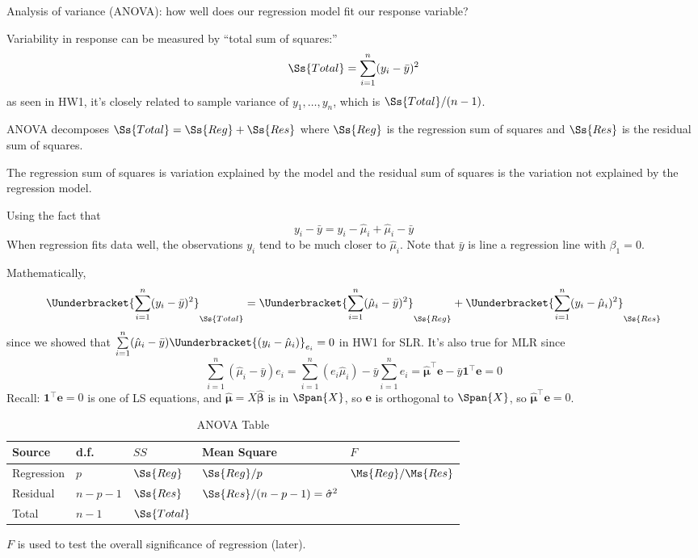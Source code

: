Analysis of variance (ANOVA): how well
does our regression model fit our
response variable?

Variability in response can be measured by
``total sum of squares:''
\[ \Ss{Total} =
    \sum\limits_{i=1}^{n} (y_i-\bar{y})^2 \]
as seen in HW1, it's closely related to
sample variance of $ y_1,\ldots,y_n $,
which is $ \Ss{Total}/(n-1) $.

ANOVA decomposes $ \Ss{Total}=\Ss{Reg}+\Ss{Res} $
where $ \Ss{Reg} $ is the regression sum of squares
and $ \Ss{Res} $ is the residual sum of squares.

The regression sum of squares is variation explained by
the model
and the residual sum of squares is the variation not
explained by the regression model.

Using the fact that
\[ y_i-\bar{y}=y_i-\hat{\mu}_i+\hat{\mu}_i-\bar{y} \]
When regression fits data well,
the observations $ y_i $ tend to be much closer to $ \hat{\mu}_i $.
Note that $ \bar{y} $ is line a regression line with $ \beta_1=0 $.

Mathematically,
\[ \Uunderbracket{\sum\limits_{i=1}^{n} (y_i-\bar{y})^2}_{\Ss{Total}}
    =\Uunderbracket{\sum\limits_{i=1}^{n} (\hat{\mu}_i-\bar{y})^2}_{\Ss{Reg}}+
    \Uunderbracket{\sum\limits_{i=1}^{n} (y_i-\hat{\mu}_i)^2}_{\Ss{Res}} \]
since we showed that $ \sum\limits_{i=1}^{n}(\hat{\mu}_i-\bar{y})
    \Uunderbracket{(y_i-\hat{\mu}_i)}_{e_i}=0 $ in HW1 for SLR\@.
It's also true for MLR since
\[ \sum\limits_{i=1}^{n} (\hat{\mu}_i-\bar{y})e_i=
    \sum\limits_{i=1}^{n} (e_i\hat{\mu}_i)-\bar{y}\sum\limits_{i=1}^{n} e_i
    =\hat{\symbf{\mu}}^\top\symbf{e}-\bar{y}\symbf{1}^\top\symbf{e}=0 \]
Recall: $ \symbf{1}^\top\symbf{e}=0 $ is one of LS equations,
and $ \hat{\symbf{\mu}}=X\hat{\symbf{\beta}} $ is in $ \Span{X} $,
so $ \symbf{e} $ is orthogonal to $ \Span{X} $,
so $ \hat{\symbf{\mu}}^\top\symbf{e}=0 $.

\begin{table}[H]
    \centering
    \caption{ANOVA Table}
    \begin{tabu} to 1\textwidth {Y[0.5]YYY[2]Y}
        \toprule
        Source     & d.f.      & $ SS $         & Mean Square                         & $ F $                 \\
        \midrule
        Regression & $ p $     & $ \Ss{Reg} $   & $ \Ss{Reg}/p $                      & $ \Ms{Reg}/\Ms{Res} $ \\
        Residual   & $ n-p-1 $ & $ \Ss{Res} $   & $ \Ss{Res}/(n-p-1)=\hat{\sigma}^2 $                         \\
        \midrule
        Total      & $ n-1 $   & $ \Ss{Total} $                                                               \\
        \bottomrule
    \end{tabu}
\end{table}
$ F $ is used to test the overall significance of regression (later).

